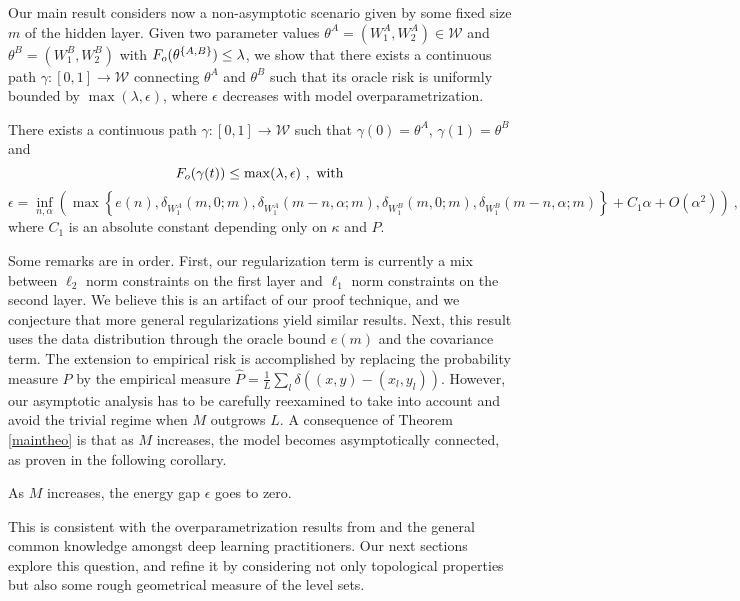 Our main result considers now a non-asymptotic scenario given by some fixed
size $m$ of the hidden layer. Given two parameter values $\theta^A = (W_1^A, W_2^A) \in \mathcal{W}$ 
and $\theta^B= (W_1^B, W_2^B)$ with $F_{o}(\theta^{\{A,B\} } ) \leq \lambda$, 
we show that there exists a continuous path 
$\gamma: [0,1] \to \mathcal{W}$ connecting $\theta^A$ and $\theta^B$ 
such that its oracle risk is uniformly bounded by $\max(\lambda, \epsilon)$, where $\epsilon$ 
decreases with model overparametrization. 
\begin{theorem}
\label{maintheo}
There exists a continuous path $\gamma: [0,1] \to \mathcal{W}$ such that
$\gamma(0) = \theta^A$, $\gamma(1) = \theta^B$ and
\begin{equation}
F_{o}( \gamma(t) )  \leq \max( \lambda, \epsilon)~,\text{ with}
\end{equation}
\begin{equation}
\epsilon = \inf_{n, \alpha} \left(\max \left\{ e(n), \delta_{W_1^A}(m, 0; m ) , \delta_{W_1^A}(m-n, \alpha; m ) ,  \delta_{W_1^B}(m, 0; m ) , \delta_{W_1^B}(m-n, \alpha; m ) \right\} + C_1 \alpha  + O(\alpha^2) \right)~,
\end{equation}
where $C_1$ is an absolute constant depending only on $\kappa$ and $P$.
\end{theorem}
Some remarks are in order. First, our regularization term is currently a mix between $\ell_2$ norm constraints on the first layer and $\ell_1$ norm constraints on the second layer. We believe this is an artifact of our proof technique, and we conjecture that more general regularizations yield similar results. Next, this result uses the data distribution through the oracle bound $e(m)$ and the covariance term. The 
extension to empirical risk is accomplished by replacing the probability measure $P$ by the empirical measure $\hat{P} = \frac{1}{L} \sum_l \delta\left( (x,y) - (x_l, y_l)\right) $. However, our asymptotic analysis has to be carefully reexamined to take into account and avoid the trivial regime when $M$ outgrows $L$.  
A consequence of Theorem \ref{maintheo} is that as $M$ increases, the model becomes asymptotically connected, as proven in the following corollary.
\begin{corollary}
\label{maincoro}
As $M$ increases, the energy gap $\epsilon$ goes to zero.
\end{corollary}
This is consistent with the overparametrization results from \cite{shamir} and the general common knowledge amongst deep learning practitioners. Our next sections explore this question, and refine it by considering not only topological properties but also some rough geometrical measure of the level sets.








